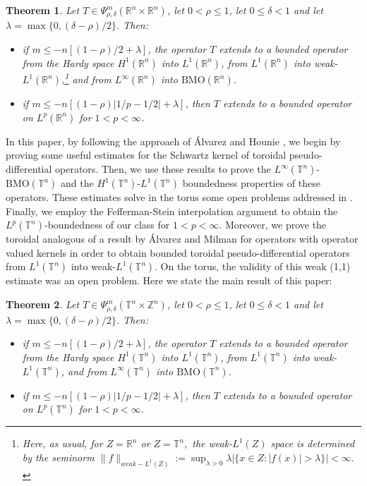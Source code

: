 \documentclass[12pt, reqno]{amsart}
\newtheorem{theorem}{Theorem}[section]
\theoremstyle{definition}
\theoremstyle{remark}
\numberwithin{equation}{section}
\begin{document}
\begin{theorem}
    Let $T \in \Psi^m_{\rho, \delta}(\mathbb{R}^n \times \mathbb{R}^n) $, let $0 < \rho \leq 1$, let $0 \leq \delta < 1$ and let $\lambda = \max\{ 0, (\delta-\rho)/2 \}$. Then:
    \begin{itemize}
        \item[(a)] if $m \leq - n [(1-\rho)/2 + \lambda]$, the operator $T$ extends to a bounded operator from the Hardy space $H^1(\mathbb{R}^n)$ into $L^1(\mathbb{R}^n)$, from $L^1(\mathbb{R}^n)$ into weak-$L^1(\mathbb{R}^n)$,\footnote{Here, as usual, for $Z=\mathbb{R}^n$ or $Z=\mathbb{T}^n,$ the weak-$L^1(Z)$ space is determined by the seminorm $\|f\|_{weak-L^1(Z)} := \sup_{\lambda > 0} \lambda|\{x \in Z : |f(x)| > \lambda \}| < \infty.$} and from $L^\infty(\mathbb{R}^n)$ into $\mathrm{BMO}(\mathbb{R}^n)$.\\
        \item[(b)] if $m \leq -n[(1-\rho)|1/p - 1/2| + \lambda]$, then $T$ extends to a bounded operator on $L^p(\mathbb{R}^n)$ for $1<p<\infty$.
    \end{itemize}    
    \label{theo:mainR}
\end{theorem}


In this paper, by following the approach of \'Alvarez and Hounie \cite{alvarez-hounie}, we begin by proving some useful estimates for the Schwartz kernel of toroidal pseudo-differential operators. Then, we use these results to prove the $L^\infty(\mathbb{T}^n)$-$\mathrm{BMO}(\mathbb{T}^n)$ and the $H^1(\mathbb{T}^n)$-$L^1(\mathbb{T}^n)$ boundedness properties of these operators. These estimates solve in the torus some open problems addressed in \cite{cardona-ruzhansky-subelliptic}. Finally, we employ the Fefferman-Stein interpolation argument to obtain the $L^p(\mathbb{T}^n)$-boundedness of our class for $1<p<\infty$. Moreover, we prove the toroidal analogous of a result  by \'Alvarez and Milman \cite[Theorem~4.1]{alvarez-milman} for operators with operator valued kernels in order to obtain bounded toroidal pseudo-differential operators from $L^1(\mathbb{T}^n)$ into weak-$L^1(\mathbb{T}^n)$. On the torus, the validity of this weak (1,1) estimate was an open problem. Here we state the main result of this paper:
\begin{theorem}
    Let $T \in \Psi^m_{\rho, \delta}(\mathbb{T}^n \times \mathbb{Z}^n) $, let $0 < \rho \leq 1$, let $0 \leq \delta < 1$ and let $\lambda = \max\{ 0, (\delta-\rho)/2 \}$. Then:
    \begin{itemize}
        \item[(a)] if $m \leq - n [(1-\rho)/2 + \lambda]$, the operator $T$ extends to a bounded operator from the Hardy space $H^1(\mathbb{T}^n)$ into $L^1(\mathbb{T}^n)$, from $L^1(\mathbb{T}^n)$ into weak-$L^1(\mathbb{T}^n)$, and from $L^\infty(\mathbb{T}^n)$ into $\mathrm{BMO}(\mathbb{T}^n)$.\\
        \item[(b)] if $m \leq -n[(1-\rho)|1/p - 1/2| + \lambda]$, then $T$ extends to a bounded operator on $L^p(\mathbb{T}^n)$ for $1<p<\infty$.
    \end{itemize}    
    \label{theo:mainT}
\end{theorem}
\end{document}
